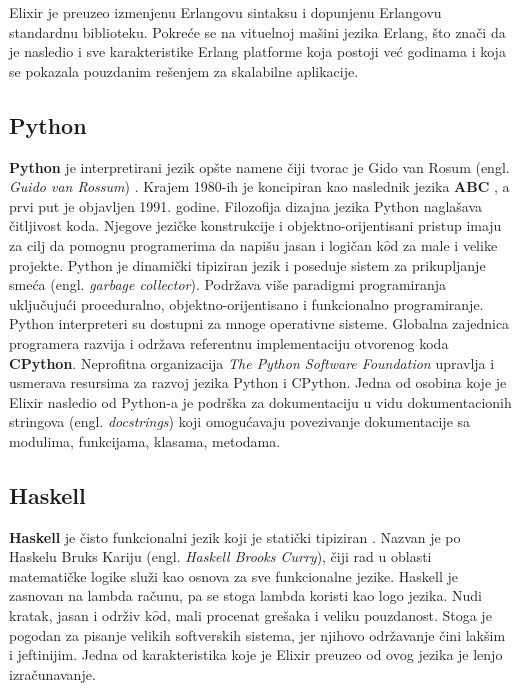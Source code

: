 \documentclass[12pt,oneside]{memoir}
\begin{document}
Elixir je preuzeo izmenjenu Erlangovu sintaksu i dopunjenu Erlangovu standardnu biblioteku. Pokreće se na vituelnoj mašini jezika Erlang, što znači da je nasledio i sve karakteristike Erlang platforme koja postoji već godinama i koja se pokazala pouzdanim rešenjem za skalabilne aplikacije.

\subsection{Python}
\textbf{Python} je interpretirani jezik opšte namene čiji tvorac je Gido van Rosum (engl. \textit{Guido van Rossum}) \cite{Python}. Krajem 1980-ih je koncipiran kao naslednik jezika \textbf{ABC} \cite{ABC}, a prvi put je objavljen 1991. godine. Filozofija dizajna jezika Python naglašava čitljivost koda. Njegove jezičke konstrukcije i objektno-orijentisani pristup imaju za cilj da pomognu programerima da napišu jasan i logičan k$\hat{o}$d za male i velike projekte. Python je dinamički tipiziran jezik i poseduje sistem za prikupljanje smeća (engl. \textit{garbage collector}). Podržava više paradigmi programiranja uključujući proceduralno, objektno-orijentisano i funkcionalno programiranje. Python interpreteri su dostupni za mnoge operativne sisteme. Globalna zajednica programera razvija i održava referentnu implementaciju otvorenog koda \textbf{CPython}. Neprofitna organizacija \textit{The Python Software Foundation} upravlja i usmerava resursima za razvoj jezika Python i CPython. Jedna od osobina koje je Elixir nasledio od Python-a je podrška za dokumentaciju u vidu dokumentacionih stringova (engl. \textit{docstrings}) koji omogućavaju povezivanje dokumentacije sa modulima, funkcijama, klasama, metodama.

\newpage

\subsection{Haskell}
\textbf{Haskell} je čisto funkcionalni jezik koji je statički tipiziran \cite{Haskell}. Nazvan je po Haskelu Bruks Kariju (engl. \textit{Haskell Brooks Curry}), čiji rad u oblasti matematičke logike služi kao osnova za sve funkcionalne jezike. Haskell je zasnovan na lambda računu, pa se stoga lambda koristi kao logo jezika. Nudi kratak, jasan i održiv k$\hat{o}$d, mali procenat grešaka i veliku pouzdanost. Stoga je pogodan za pisanje velikih softverskih sistema, jer njihovo održavanje čini lakšim i jeftinijim. Jedna od karakteristika koje je Elixir preuzeo od ovog jezika je lenjo izračunavanje.
\end{document}
